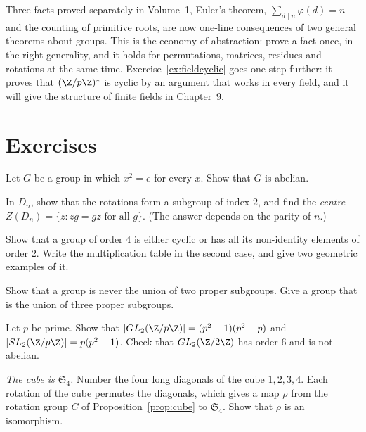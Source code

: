 \begin{beauty}
Three facts proved separately in Volume~1, Euler's theorem, $\sum_{d\mid n}\varphi(d)=n$ and the counting of primitive roots, are now one-line consequences of two general theorems about groups. This is the economy of abstraction: prove a fact once, in the right generality, and it holds for permutations, matrices, residues and rotations at the same time. Exercise~\ref{ex:fieldcyclic} goes one step further: it proves that $(\Z/p\Z)^*$ is cyclic by an argument that works in every field, and it will give the structure of finite fields in Chapter~9.
\end{beauty}

\section{Exercises}

\begin{exercise}[$\star$]\label{ex:square}
Let $G$ be a group in which $x^2=e$ for every $x$. Show that $G$ is abelian.
\end{exercise}

\begin{exercise}[$\star$]\label{ex:dihedralcentre}
In $D_n$, show that the rotations form a subgroup of index $2$, and find the \emph{centre} $Z(D_n)=\{z:zg=gz\text{ for all }g\}$. (The answer depends on the parity of $n$.)
\end{exercise}

\begin{exercise}[$\star$]\label{ex:order4}
Show that a group of order $4$ is either cyclic or has all its non-identity elements of order $2$. Write the multiplication table in the second case, and give two geometric examples of it.
\end{exercise}

\begin{exercise}[$\star\star$]\label{ex:union}
Show that a group is never the union of two proper subgroups. Give a group that is the union of three proper subgroups.
\end{exercise}

\begin{exercise}[$\star\star$]\label{ex:gl2}
Let $p$ be prime. Show that $|GL_2(\Z/p\Z)|=(p^2-1)(p^2-p)$ and $|SL_2(\Z/p\Z)|=p(p^2-1)$. Check that $GL_2(\Z/2\Z)$ has order $6$ and is not abelian.
\end{exercise}

\begin{exercise}[$\star\star$]\label{ex:cubeS4}
\emph{The cube is $\mathfrak S_4$.} Number the four long diagonals of the cube $1,2,3,4$. Each rotation of the cube permutes the diagonals, which gives a map $\rho$ from the rotation group $C$ of Proposition~\ref{prop:cube} to $\mathfrak S_4$. Show that $\rho$ is an isomorphism.
\end{exercise}

